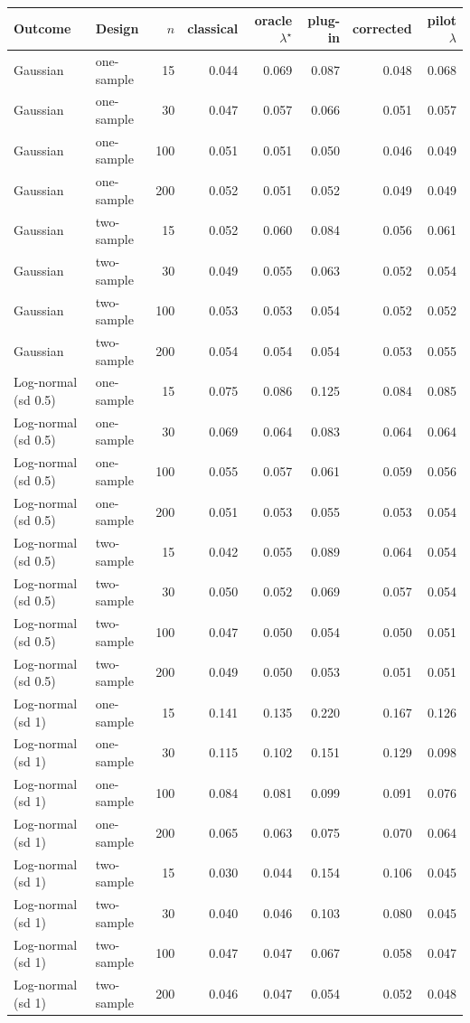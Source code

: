 \begin{tabular}{llrrrrrr}
\toprule
Outcome & Design & $n$ & classical & oracle $\lambda^\star$ & plug-in & corrected & pilot $\lambda$ \\
\midrule
Gaussian & one-sample & 15 & 0.044 & 0.069 & 0.087 & 0.048 & 0.068 \\
Gaussian & one-sample & 30 & 0.047 & 0.057 & 0.066 & 0.051 & 0.057 \\
Gaussian & one-sample & 100 & 0.051 & 0.051 & 0.050 & 0.046 & 0.049 \\
Gaussian & one-sample & 200 & 0.052 & 0.051 & 0.052 & 0.049 & 0.049 \\
Gaussian & two-sample & 15 & 0.052 & 0.060 & 0.084 & 0.056 & 0.061 \\
Gaussian & two-sample & 30 & 0.049 & 0.055 & 0.063 & 0.052 & 0.054 \\
Gaussian & two-sample & 100 & 0.053 & 0.053 & 0.054 & 0.052 & 0.052 \\
Gaussian & two-sample & 200 & 0.054 & 0.054 & 0.054 & 0.053 & 0.055 \\
Log-normal (sd 0.5) & one-sample & 15 & 0.075 & 0.086 & 0.125 & 0.084 & 0.085 \\
Log-normal (sd 0.5) & one-sample & 30 & 0.069 & 0.064 & 0.083 & 0.064 & 0.064 \\
Log-normal (sd 0.5) & one-sample & 100 & 0.055 & 0.057 & 0.061 & 0.059 & 0.056 \\
Log-normal (sd 0.5) & one-sample & 200 & 0.051 & 0.053 & 0.055 & 0.053 & 0.054 \\
Log-normal (sd 0.5) & two-sample & 15 & 0.042 & 0.055 & 0.089 & 0.064 & 0.054 \\
Log-normal (sd 0.5) & two-sample & 30 & 0.050 & 0.052 & 0.069 & 0.057 & 0.054 \\
Log-normal (sd 0.5) & two-sample & 100 & 0.047 & 0.050 & 0.054 & 0.050 & 0.051 \\
Log-normal (sd 0.5) & two-sample & 200 & 0.049 & 0.050 & 0.053 & 0.051 & 0.051 \\
Log-normal (sd 1) & one-sample & 15 & 0.141 & 0.135 & 0.220 & 0.167 & 0.126 \\
Log-normal (sd 1) & one-sample & 30 & 0.115 & 0.102 & 0.151 & 0.129 & 0.098 \\
Log-normal (sd 1) & one-sample & 100 & 0.084 & 0.081 & 0.099 & 0.091 & 0.076 \\
Log-normal (sd 1) & one-sample & 200 & 0.065 & 0.063 & 0.075 & 0.070 & 0.064 \\
Log-normal (sd 1) & two-sample & 15 & 0.030 & 0.044 & 0.154 & 0.106 & 0.045 \\
Log-normal (sd 1) & two-sample & 30 & 0.040 & 0.046 & 0.103 & 0.080 & 0.045 \\
Log-normal (sd 1) & two-sample & 100 & 0.047 & 0.047 & 0.067 & 0.058 & 0.047 \\
Log-normal (sd 1) & two-sample & 200 & 0.046 & 0.047 & 0.054 & 0.052 & 0.048 \\
\bottomrule
\end{tabular}
